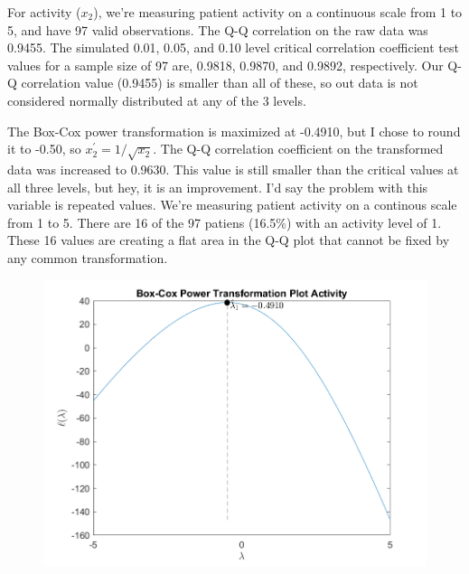For activity ($x_{2}$), we're measuring patient activity on a continuous scale from 1 to 5, and have 97 valid observations. The Q-Q correlation on the raw data was 0.9455. The simulated 0.01, 0.05, and 0.10 level critical correlation coefficient test values for a sample size of 97 are, 0.9818, 0.9870, and 0.9892, respectively. Our Q-Q correlation value (0.9455) is smaller than all of these, so out data is not considered normally distributed at any of the 3 levels.

The Box-Cox power transformation is maximized at -0.4910, but I chose to round it to -0.50, so $x_{2}^{\prime} = 1/\sqrt{x_{2}}$. The Q-Q correlation coefficient on the transformed data was increased to 0.9630. This value is still smaller than the critical values at all three levels, but hey, it is an improvement. I'd say the problem with this variable is repeated values. We're measuring patient activity on a continous scale from 1 to 5. There are 16 of the 97 patiens (16.5\%) with an activity level of 1. These 16 values are creating a flat area in the Q-Q plot that cannot be fixed by any common transformation.

\begin{center}
    \begin{figure}[H]
        \centering
        \includegraphics[scale=0.6]{./matlab/chapter-4/sol4.32.power.2.png}
    \end{figure}
\end{center}

